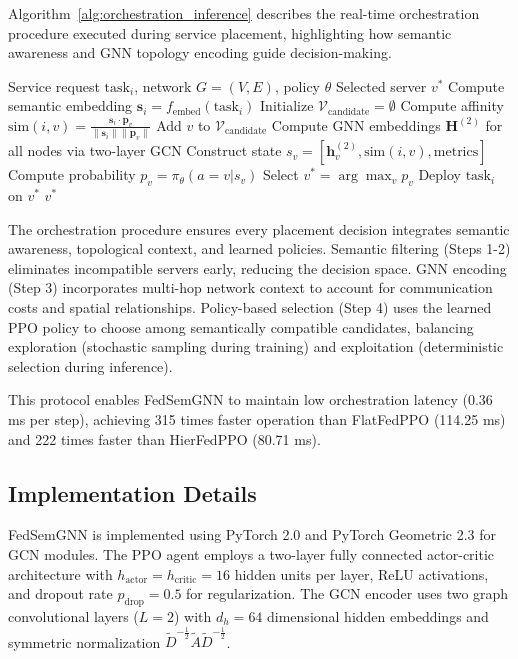 \documentclass[conference]{IEEEtran}
\begin{document}
	Algorithm~\ref{alg:orchestration_inference} describes the real-time orchestration procedure executed during service placement, highlighting how semantic awareness and GNN topology encoding guide decision-making.
	
	\begin{algorithm}[t]
		\caption{FedSemGNN Orchestration (Inference)}
		\label{alg:orchestration_inference}
		\begin{algorithmic}[1]
			\REQUIRE Service request $\text{task}_i$, network $G=(V,E)$, policy $\theta$
			\ENSURE Selected server $v^*$
			\STATE Compute semantic embedding $\mathbf{s}_i = f_{\text{embed}}(\text{task}_i)$
			\STATE Initialize $\mathcal{V}_{\text{candidate}} = \emptyset$
			\STATE Compute affinity $\text{sim}(i,v) = \frac{\mathbf{s}_i \cdot \mathbf{p}_v}{\|\mathbf{s}_i\| \|\mathbf{p}_v\|}$
			\STATE Add $v$ to $\mathcal{V}_{\text{candidate}}$
			\ENDIF
			\ENDFOR
			\STATE
			\STATE Compute GNN embeddings $\mathbf{H}^{(2)}$ for all nodes via two-layer GCN
			\STATE Construct state $s_v = [\mathbf{h}_v^{(2)}, \text{sim}(i,v), \text{metrics}]$
			\STATE Compute probability $p_v = \pi_\theta(a=v | s_v)$
			\ENDFOR
			\STATE
			\STATE Select $v^* = \arg\max_v p_v$
			\STATE Deploy $\text{task}_i$ on $v^*$
			\RETURN $v^*$
		\end{algorithmic}
	\end{algorithm}
	
	The orchestration procedure ensures every placement decision integrates semantic awareness, topological context, and learned policies. Semantic filtering (Steps 1-2) eliminates incompatible servers early, reducing the decision space. GNN encoding (Step 3) incorporates multi-hop network context to account for communication costs and spatial relationships. Policy-based selection (Step 4) uses the learned PPO policy to choose among semantically compatible candidates, balancing exploration (stochastic sampling during training) and exploitation (deterministic selection during inference).
	
	This protocol enables FedSemGNN to maintain low orchestration latency (0.36 ms per step), achieving 315 times faster operation than FlatFedPPO (114.25 ms) and 222 times faster than HierFedPPO (80.71 ms).
	
	\subsection{Implementation Details}
	FedSemGNN is implemented using PyTorch 2.0 and PyTorch Geometric 2.3 for GCN modules. The PPO agent employs a two-layer fully connected actor-critic architecture with $h_{\text{actor}} = h_{\text{critic}} = 16$ hidden units per layer, ReLU activations, and dropout rate $p_{\text{drop}} = 0.5$ for regularization. The GCN encoder uses two graph convolutional layers ($L = 2$) with $d_h = 64$ dimensional hidden embeddings and symmetric normalization $\tilde{D}^{-\frac{1}{2}} \tilde{A} \tilde{D}^{-\frac{1}{2}}$.
	
\end{document}
